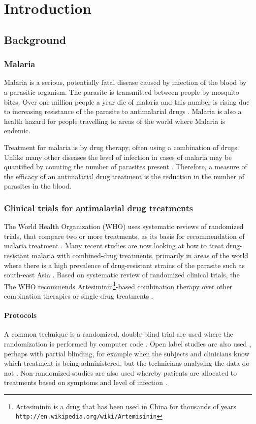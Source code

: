 \chapter{Introduction}\label{ch:intro}
\section{Background}
\subsection{Malaria}
Malaria is a serious, potentially fatal disease caused by infection of the blood by a parasitic organism. The parasite is transmitted between people by mosquito bites. Over one million people a year die of malaria and this number is rising due to increasing resistance of the parasite to antimalarial drugs \cite{who}. Malaria is also a health hazard for people travelling to areas of the world where Malaria is endemic.

Treatment for malaria is by drug therapy, often using a combination of drugs. Unlike many other diseases the level of infection in cases of malaria may be quantified by counting the number of parasites present \cite{white}. Therefore, a measure of the efficacy of an antimalarial drug treatment is the reduction in the number of parasites in the blood. 

\subsection{Clinical trials for antimalarial drug treatments}
The World Health Organization (WHO) uses systematic reviews of randomized trials, that compare two or more treatments, as its basis for recommendation of malaria treatment \cite{who}. Many recent studies are now looking at how to treat drug-resistant malaria with combined-drug treatments, primarily in areas of the world where there is a high prevalence of drug-resistant strains of the parasite such as south-east Asia \cite{smithuis}. Based on systematic review of randomized clinical trials, the The WHO recommends Artesiminin\footnote{Artesiminin is a drug that has been used in China for thousands of years \texttt{http://en.wikipedia.org/wiki/Artemisinin}}-based combination therapy over other combination therapies or single-drug treatments \cite{who}. 

\subsubsection*{Protocols}
A common technique is a randomized, double-blind trial are used where the randomization is performed by computer code \cite{bell, newton, vries}. Open label studies are also used \cite{wootton, smithuis}, perhaps with partial blinding, for example when the subjects and clinicians know which treatment is being administered, but the technicians analysing the data do not \cite{wootton}. Non-randomized studies are also used whereby patients are allocated to treatments based on symptoms and level of infection \cite{carmello}.

